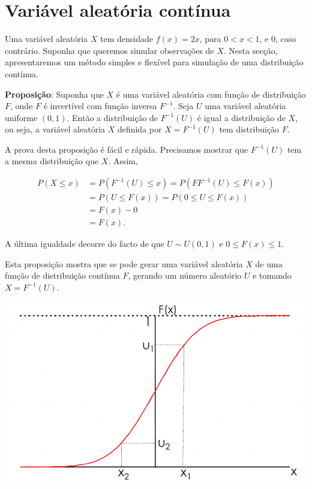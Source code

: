 \documentclass[
]{book}
\begin{document}
\section{Variável aleatória contínua}\label{variuxe1vel-aleatuxf3ria-contuxednua}

Uma variável aleatória \(X\) tem densidade \(f(x)=2x\), para \(0<x<1\), e 0,
caso contrário. Suponha que queremos simular observações de \(X\). Nesta
secção, apresentaremos um método simples e flexível para simulação de
uma distribuição contínua.

\textbf{Proposição}: Suponha que \(X\) é uma variável aleatória com função de
distribuição \(F\), onde \(F\) é invertível com função inversa \(F^{-1}\).
Seja \(U\) uma variável aleatória uniforme \((0,1)\). Então a distribuição
de \(F^{-1}(U)\) é igual a distribuição de \(X\), ou seja, a variável
aleatória \(X\) definida por \(X=F^{-1}(U)\) tem distribuição \(F\).

A prova desta proposição é fácil e rápida. Precisamos mostrar que
\(F^{-1}(U)\) tem a mesma distribuição que \(X\). Assim,

\begin{align*}
P(X \leq x) &= P(F^{-1}(U)\leq x) = P(FF^{-1}(U) \leq F(x)) \\
&= P(U \leq F(x)) = P(0\leq U \leq F(x)) \\
&= F(x)-0 \\
&= F(x).
\end{align*}

A última igualdade decorre do facto de que \(U\sim U(0,1)\) e
\(0\leq F(x) \leq 1\).

Esta proposição mostra que se pode gerar uma variável aleatória \(X\) de
uma função de distribuição contínua \(F\), gerando um número aleatório \(U\)
e tomando \(X = F^{-1}(U)\).

\includegraphics{docs/transf_inversa2.png}
\end{document}

